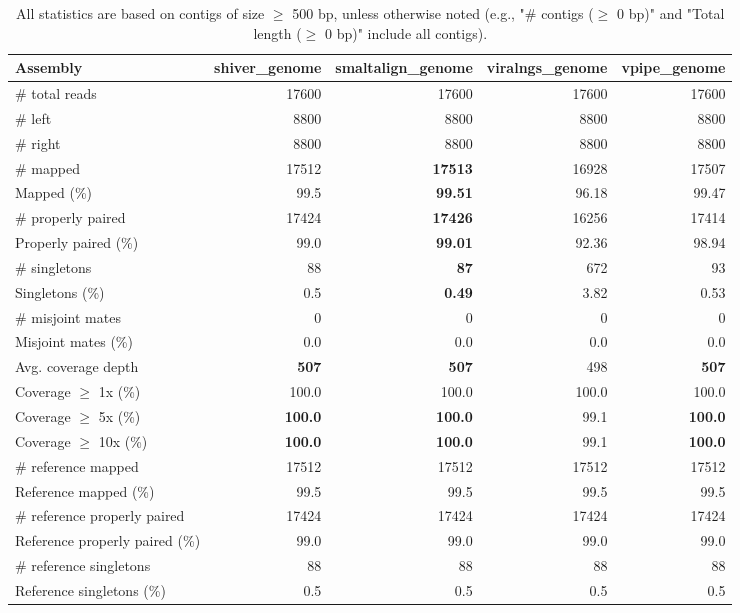 \documentclass[12pt,a4paper]{article}
\begin{document}
\begin{table}[ht]
\begin{center}
\caption{All statistics are based on contigs of size $\geq$ 500 bp, unless otherwise noted (e.g., "\# contigs ($\geq$ 0 bp)" and "Total length ($\geq$ 0 bp)" include all contigs).}
\begin{tabular}{|l*{4}{|r}|}
\hline
Assembly & shiver\_genome & smaltalign\_genome & viralngs\_genome & vpipe\_genome \\ \hline
\# total reads & 17600 & 17600 & 17600 & 17600 \\ \hline
\# left & 8800 & 8800 & 8800 & 8800 \\ \hline
\# right & 8800 & 8800 & 8800 & 8800 \\ \hline
\# mapped & 17512 & {\bf 17513} & 16928 & 17507 \\ \hline
Mapped (\%) & 99.5 & {\bf 99.51} & 96.18 & 99.47 \\ \hline
\# properly paired & 17424 & {\bf 17426} & 16256 & 17414 \\ \hline
Properly paired (\%) & 99.0 & {\bf 99.01} & 92.36 & 98.94 \\ \hline
\# singletons & 88 & {\bf 87} & 672 & 93 \\ \hline
Singletons (\%) & 0.5 & {\bf 0.49} & 3.82 & 0.53 \\ \hline
\# misjoint mates & 0 & 0 & 0 & 0 \\ \hline
Misjoint mates (\%) & 0.0 & 0.0 & 0.0 & 0.0 \\ \hline
Avg. coverage depth & {\bf 507} & {\bf 507} & 498 & {\bf 507} \\ \hline
Coverage $\geq$ 1x (\%) & 100.0 & 100.0 & 100.0 & 100.0 \\ \hline
Coverage $\geq$ 5x (\%) & {\bf 100.0} & {\bf 100.0} & 99.1 & {\bf 100.0} \\ \hline
Coverage $\geq$ 10x (\%) & {\bf 100.0} & {\bf 100.0} & 99.1 & {\bf 100.0} \\ \hline
\# reference mapped & 17512 & 17512 & 17512 & 17512 \\ \hline
Reference mapped (\%) & 99.5 & 99.5 & 99.5 & 99.5 \\ \hline
\# reference properly paired & 17424 & 17424 & 17424 & 17424 \\ \hline
Reference properly paired (\%) & 99.0 & 99.0 & 99.0 & 99.0 \\ \hline
\# reference singletons & 88 & 88 & 88 & 88 \\ \hline
Reference singletons (\%) & 0.5 & 0.5 & 0.5 & 0.5 \\ \hline

\end{tabular}
\end{center}
\end{table}
\end{document}
